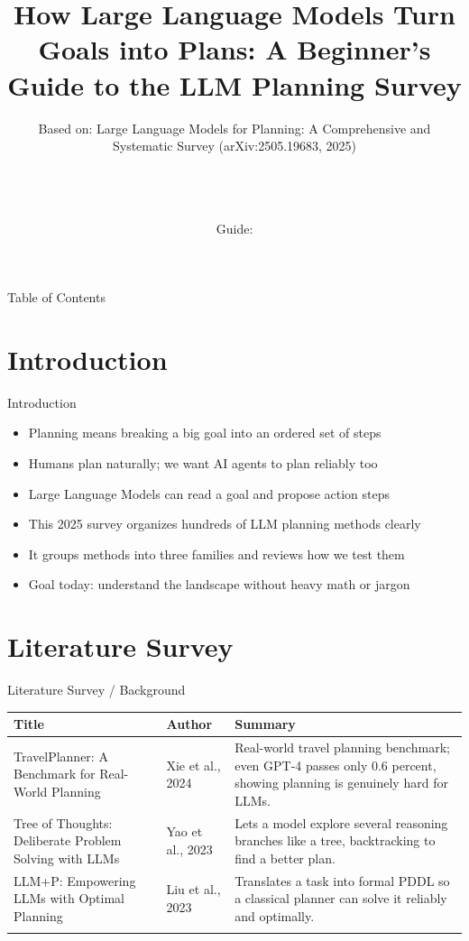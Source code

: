 \documentclass[10pt]{beamer}
\title[B.Tech Seminar]{How Large Language Models Turn Goals into Plans: A Beginner's Guide to the LLM Planning Survey}
\subtitle{Based on: Large Language Models for Planning: A Comprehensive and Systematic Survey (arXiv:2505.19683, 2025)}
\author[\studentname\ (\shortinst)]{\studentname \\ \small \rollno \\ \small \rollclass \\ \small Guide: \guidename}
\institute[]{\deptname \\ \collegename}
\date{\seminardate}
\begin{document}
\begin{frame}[plain]
  \titlepage
\end{frame}
\begin{frame}{Table of Contents}
  \tableofcontents
\end{frame}
\section{Introduction}
\begin{frame}{Introduction}
\begin{itemize}
  \item Planning means breaking a big goal into an ordered set of steps
  \item Humans plan naturally; we want AI agents to plan reliably too
  \item Large Language Models can read a goal and propose action steps
  \item This 2025 survey organizes hundreds of LLM planning methods clearly
  \item It groups methods into three families and reviews how we test them
  \item Goal today: understand the landscape without heavy math or jargon
\end{itemize}
\end{frame}
\section{Literature Survey}
\begin{frame}{Literature Survey / Background}
  \small
  \begin{tabular}{@{}p{2.7cm}p{2.3cm}p{5.6cm}@{}}
    \toprule
    \textbf{Title} & \textbf{Author} & \textbf{Summary} \\
    \midrule
    TravelPlanner: A Benchmark for Real-World Planning & Xie et al., 2024 & Real-world travel planning benchmark; even GPT-4 passes only 0.6 percent, showing planning is genuinely hard for LLMs. \\
    \addlinespace
    Tree of Thoughts: Deliberate Problem Solving with LLMs & Yao et al., 2023 & Lets a model explore several reasoning branches like a tree, backtracking to find a better plan. \\
    \addlinespace
    LLM+P: Empowering LLMs with Optimal Planning & Liu et al., 2023 & Translates a task into formal PDDL so a classical planner can solve it reliably and optimally. \\
    \addlinespace
    \bottomrule
  \end{tabular}
\end{frame}
\end{document}
